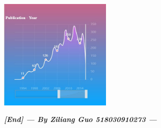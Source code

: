 \documentclass[10pt,twoside,a4paper,titlepage]{article}
\begin{document}
		\includegraphics[width=0.4\textwidth]{gjl/3.jpg}\newline\par

		\textbf{\emph{[End] --- By Ziliang Guo 518030910273 ---}}

		


\newpage


\end{document}

